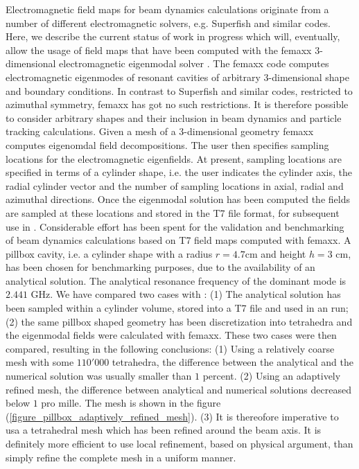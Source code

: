 Electromagnetic field maps for beam dynamics calculations originate from a number of different
electromagnetic solvers, e.g. Superfish and similar codes.
Here, we describe the current status of work in progress which will, eventually,
allow the usage of field maps that have been computed with the femaxx $3$-dimensional
electromagnetic eigenmodal solver \cite{bib:arbenzetal2001,bib:arbenzetal2006}.
The femaxx code computes electromagnetic eigenmodes of resonant cavities of
arbitrary $3$-dimensional shape and boundary conditions.
In contrast to Superfish and similar codes, restricted to azimuthal symmetry,
femaxx has got no such restrictions. It is therefore possible to consider arbitrary
shapes and their inclusion in beam dynamics and particle tracking calculations.
Given a mesh of a $3$-dimensional geometry femaxx computes eigenomdal field
decompositions.
The user then specifies sampling locations for the electromagnetic eigenfields.
At present, sampling locations are specified in terms of a cylinder shape,
i.e. the user indicates the cylinder axis, the radial cylinder vector and 
the number of sampling locations in axial, radial and azimuthal directions.
Once the eigenmodal solution has been computed the fields are sampled at
these locations and stored in the T7 file format, for subsequent use in \opal.
Considerable effort has been spent for the validation and benchmarking of
beam dynamics calculations based on T7 field maps computed with femaxx.
A pillbox cavity, i.e. a cylinder shape with a radius $r = 4.7$cm and
height $h = 3$ cm, has been chosen for benchmarking purposes,
due to the availability of an analytical solution.
The analytical resonance frequency of the dominant mode is $2.441$ GHz.
We have compared two cases with \opal: (1) The analytical solution has been
sampled within a cylinder volume, stored into a T7 file and used in an \opal
run; (2) the same pillbox shaped geometry has been discretization into tetrahedra
and the eigenmodal fields were calculated with femaxx.
These two cases were then compared, resulting in the following conclusions:
(1) Using a relatively coarse mesh with some $110'000$ tetrahedra, the difference
between the analytical and the numerical solution was usually smaller than
$1$ percent.
(2) Using an adaptively refined mesh, the difference between analytical and
numerical solutions decreased below $1$ pro mille. The mesh is shown
in the figure (\ref{figure_pillbox_adaptively_refined_mesh}).
(3) It is thereofore imperative to usa a tetrahedral mesh which has been
refined around the beam axis. It is definitely more efficient to use local
refinement, based on physical argument, than simply refine the complete
mesh in a uniform manner.


